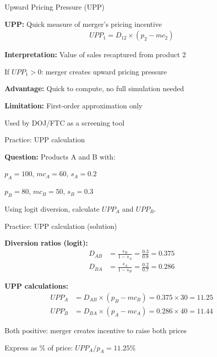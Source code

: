 \documentclass[notes,11pt, aspectratio=169]{beamer}
\newenvironment{wideitemize}{\itemize\addtolength{\itemsep}{10pt}}{\enditemize}
\begin{document}
\begin{frame}{Upward Pricing Pressure (UPP)}
	\begin{wideitemize}
		\item \textbf{UPP:} Quick measure of merger's pricing incentive
		\begin{align*}
			UPP_1 = D_{12} \times (p_2 - mc_2)
		\end{align*}
		\item \textbf{Interpretation:} Value of sales recaptured from product 2
		\item If $UPP_1 > 0$: merger creates upward pricing pressure
		\item \textbf{Advantage:} Quick to compute, no full simulation needed
		\item \textbf{Limitation:} First-order approximation only
		\item Used by DOJ/FTC as a screening tool
	\end{wideitemize}
\end{frame}

\begin{frame}{Practice: UPP calculation}
	\begin{wideitemize}
		\item \textbf{Question:} Products A and B with:
		\item $p_A = 100$, $mc_A = 60$, $s_A = 0.2$
		\item $p_B = 80$, $mc_B = 50$, $s_B = 0.3$
		\item Using logit diversion, calculate $UPP_A$ and $UPP_B$.
	\end{wideitemize}
\end{frame}

\begin{frame}{Practice: UPP calculation (solution)}
	\begin{wideitemize}
		\item \textbf{Diversion ratios (logit):}
		\begin{align*}
			D_{AB} &= \frac{s_B}{1 - s_A} = \frac{0.3}{0.8} = 0.375 \\
			D_{BA} &= \frac{s_A}{1 - s_B} = \frac{0.2}{0.7} = 0.286
		\end{align*}
		\item \textbf{UPP calculations:}
		\begin{align*}
			UPP_A &= D_{AB} \times (p_B - mc_B) = 0.375 \times 30 = 11.25 \\
			UPP_B &= D_{BA} \times (p_A - mc_A) = 0.286 \times 40 = 11.44
		\end{align*}
		\item Both positive: merger creates incentive to raise both prices
		\item Express as \% of price: $UPP_A/p_A = 11.25\%$
	\end{wideitemize}
\end{frame}
\end{document}
